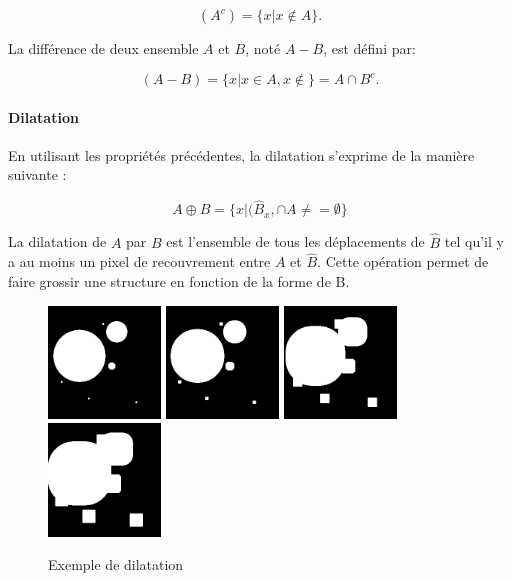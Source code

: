   \begin{equation}
    (A^c) = \{x|x \not\in A\}. 
  \end{equation}
  
  La différence de deux ensemble $A$ et $B$, noté $A - B$, est défini par:
  
  \begin{equation}
    (A-B) = \{x|x \in A, x\not\in \} = A \cap B^c.  
  \end{equation}
  
  
  \paragraph{Dilatation}
  En utilisant les propriétés précédentes, la dilatation s'exprime de la manière suivante :
  
  \begin{equation}
   A \oplus B = \{x|(\widehat{B}_x, \cap A \neq = \emptyset \}
  \end{equation}
  
  La dilatation de $A$ par $B$ est l'ensemble de tous les déplacements de $\widehat{B}$ tel qu'il y a au moins un pixel de recouvrement entre $A$ et $\widehat{B}$. Cette opération permet de faire grossir une structure en fonction de la forme de B.
  
  \begin{figure}[h]
    \centering
    \includegraphics[height=3cm]{Images/morpho_init.png}
    \includegraphics[height=3cm]{Images/morpho_dilate_k5.png}
    \includegraphics[height=3cm]{Images/morpho_dilate_k21.png}
    \includegraphics[height=3cm]{Images/morpho_dilate_k31.png}
    \label{fig:morpho_dilation}
    \caption{Exemple de dilatation}
  \end{figure}
  
